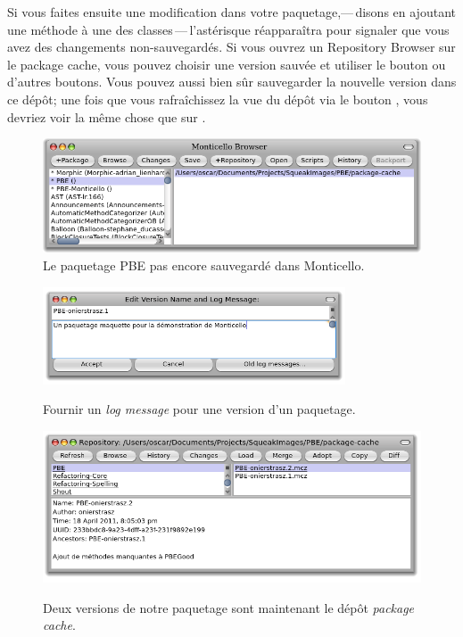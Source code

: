 \documentclass[a4paper,10pt,twoside]{book}
\begin{document}
Si vous faites ensuite une modification dans votre paquetage,---\,disons
en ajoutant une méthode à une des classes\,---\,l'astérisque réapparaîtra pour 
signaler que vous avez des changements non-sauvegardés.
Si vous ouvrez un Repository Browser sur le package cache, vous
pouvez choisir une version sauvée et utiliser le bouton 
ou d'autres boutons.
Vous pouvez aussi bien sûr sauvegarder la nouvelle version dans
ce dépôt; une fois que vous rafraîchissez la vue
du dépôt via le bouton , vous devriez voir
la même chose que sur
.

\begin{figure}[tbp]
	\begin{center}
		\includegraphics[width=\textwidth]{MC+PBE}
	\end{center}
	\caption{Le paquetage PBE pas encore sauvegardé dans Monticello.}
\end{figure}

\begin{figure}[tbp]
	\begin{center}
		{\includegraphics[width=0.8\textwidth]{PBE-on}}
	\end{center}
	\caption{Fournir un \emph{log message} pour une version d'un paquetage.}
\end{figure}

\begin{figure}[tbp]
	\begin{center}
		{\includegraphics[width=\textwidth]{package-cache-browser}}
	\end{center}
	\caption{Deux versions de notre paquetage sont maintenant le dépôt \emph{package cache}.}
\end{figure}
\end{document}
